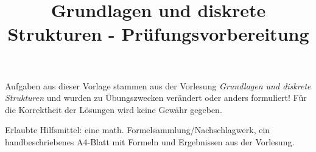 \documentclass[10pt, a4paper]{exam}
\title{Grundlagen und diskrete Strukturen - Prüfungsvorbereitung}
\author{}
\date{}
\begin{document}
\begin{myboxii}[Disclaimer]
  Aufgaben aus dieser Vorlage stammen aus der Vorlesung \textit{Grundlagen und diskrete Strukturen} und wurden zu Übungszwecken verändert oder anders formuliert! Für die Korrektheit der Lösungen wird keine Gewähr gegeben.
\end{myboxii}

Erlaubte Hilfsmittel: eine math. Formelsammlung/Nachschlagwerk, ein handbeschriebenes A4-Blatt mit Formeln und Ergebnissen aus der Vorlesung.

\begin{questions}
  \question
\end{questions}
\end{document}
